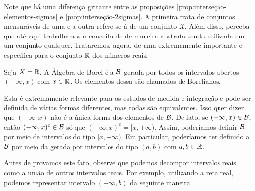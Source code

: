 Note que há uma diferença gritante entre as proposições \ref{prop:interseção-elementos-sigmas} e \ref{prop:interseção-2sigmas}.
A primeira trata de conjuntos mensuráveis de uma \sigal e a outra refere-se à \sigals de um conjunto $X$.
Além disso, perceba que até aqui trabalhamos o conceito de \sigal de maneira abstrata sendo utilizada em um conjunto qualquer. 
Trataremos, agora, de uma \sigal extremamente importante e específica para o conjunto $\mathbb{R}$ dos números reais.

\begin{definition}
\label{def:algebra-borel}
    Seja $X = \mathbb{R}$. A Álgebra de Borel é a \sigal $\operatorname{\mathcal{B}}$ gerada por todos os intervalos abertos $(-\infty,x)$ com $ x  \in \mathbb{R}$. 
    Os elementos dessa \sigal são chamados de Borelianos.

\end{definition}

Esta \sigal é extremamente relevante para os estudos de medida e integração e pode ser definida de várias formas diferentes, mas todas são equivalentes.
Isso quer dizer que $(-\infty, x)$ não é a única forma dos elementos de $\operatorname{\mathcal{B}}$. 
De fato, se  $(-\infty, x) \in \operatorname{\mathcal{B}}$, então $(-\infty, x)^c \in \operatorname{\mathcal{B}}$ só que $(-\infty, x)^c = [x, +\infty$).
Assim, poderíamos  definir  $\operatorname{\mathcal{B}}$ por meio de intervalos do tipo $[x, +\infty)$.
Em particular, poderíamos ter definido a $\operatorname{\mathcal{B}}$ por meio da \sigal gerada por intervalos do tipo $(a,b)$ com $a,b \in \mathbb{R}$. 

Antes de provamos este fato, observe que podemos decompor intervalos reais como a união de outros intervalos reais. 
Por exemplo, utilizando a reta real, podemos representar intervalo $(-\infty, b)$ da seguinte maneira\\

